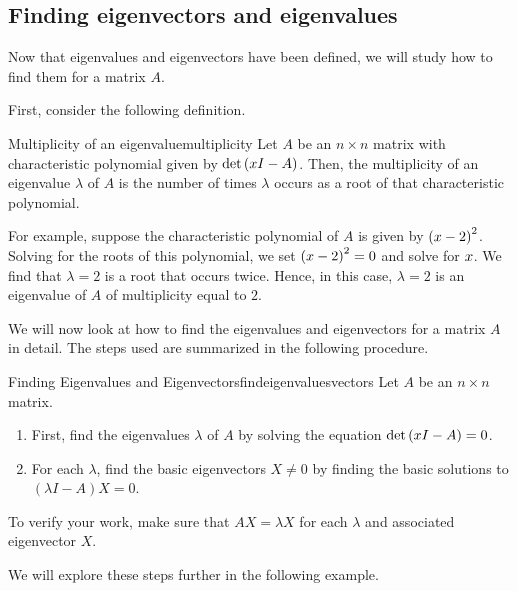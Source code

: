 \subsection{Finding eigenvectors and eigenvalues}

Now that eigenvalues and eigenvectors have been defined, we will study how to find
 them for a matrix $A$. 

First, consider the following definition.

\begin{definition}{Multiplicity of an eigenvalue}{multiplicity}
Let $A$ be an $n \times n$ matrix with characteristic polynomial given by 
$\det \left( x I -  A\right)$. Then, the multiplicity of an eigenvalue $\lambda$ of $A$
is the number of times $\lambda$ occurs as a root of that characteristic polynomial.
\end{definition}

For example, suppose the characteristic polynomial of $A$ is given by
$\left( x - 2 \right)^2$. Solving for the roots of this
polynomial, we set $\left( x - 2 \right)^2 = 0$ and solve for
$x$.  We find that $\lambda = 2$ is a root that occurs
twice. Hence, in this case, $\lambda = 2$ is an eigenvalue of $A$ of
multiplicity equal to $2$.

We will now look at how to find the eigenvalues and eigenvectors for a
matrix $A$ in detail.  The steps used are summarized in the following
procedure.

\begin{procedure}{Finding Eigenvalues and Eigenvectors}{findeigenvaluesvectors}
%
Let $A$ be an $n \times n$ matrix. 
\begin{enumerate}
\item First, find the eigenvalues $\lambda$ of $A$ by solving the equation $\det \left( x I -A \right) = 0$. 

\item For each $\lambda$, find the basic eigenvectors $X \neq 0$ by finding the basic solutions to  $\left( \lambda I - A \right) X = 0$.
\end{enumerate}

To verify your work, make sure that $AX=\lambda X$
for each $\lambda$ and associated eigenvector $X$.
\end{procedure}

We will explore these steps further in the following example.

